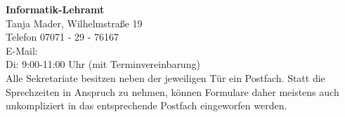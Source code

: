 \textbf{Informatik-Lehramt}\\
Tanja Mader, Wilhelmstraße 19\\
Telefon 07071 - 29 - 76167\\
E-Mail: \\
Di: 9:00-11:00 Uhr (mit Terminvereinbarung)\\

Alle Sekretariate besitzen neben der jeweiligen Tür ein Postfach. Statt die
Sprechzeiten in Anspruch zu nehmen, können Formulare daher meistens auch
unkompliziert in das entsprechende Postfach eingeworfen werden.\\
